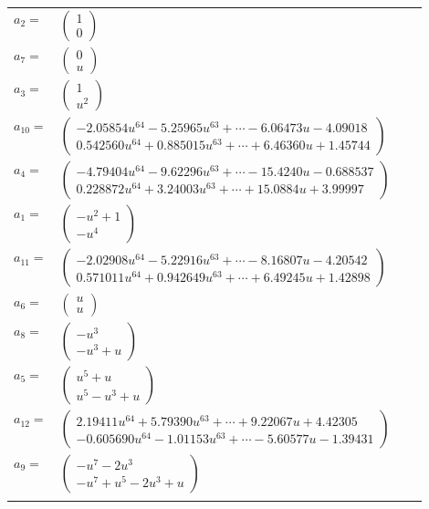 \documentclass[1p]{elsarticle_modified}
\theoremstyle{definition}
\begin{document}
\begin{tabular}{m{7pt} m{180pt} m{7pt} m{180pt} }
\flushright $a_{2}=$&$\begin{pmatrix}1\\0\end{pmatrix}$ \\
\flushright $a_{7}=$&$\begin{pmatrix}0\\u\end{pmatrix}$ \\
\flushright $a_{3}=$&$\begin{pmatrix}1\\u^2\end{pmatrix}$ \\
\flushright $a_{10}=$&$\begin{pmatrix}-2.05854 u^{64}-5.25965 u^{63}+\cdots-6.06473 u-4.09018\\0.542560 u^{64}+0.885015 u^{63}+\cdots+6.46360 u+1.45744\end{pmatrix}$ \\
\flushright $a_{4}=$&$\begin{pmatrix}-4.79404 u^{64}-9.62296 u^{63}+\cdots-15.4240 u-0.688537\\0.228872 u^{64}+3.24003 u^{63}+\cdots+15.0884 u+3.99997\end{pmatrix}$ \\
\flushright $a_{1}=$&$\begin{pmatrix}- u^2+1\\- u^4\end{pmatrix}$ \\
\flushright $a_{11}=$&$\begin{pmatrix}-2.02908 u^{64}-5.22916 u^{63}+\cdots-8.16807 u-4.20542\\0.571011 u^{64}+0.942649 u^{63}+\cdots+6.49245 u+1.42898\end{pmatrix}$ \\
\flushright $a_{6}=$&$\begin{pmatrix}u\\u\end{pmatrix}$ \\
\flushright $a_{8}=$&$\begin{pmatrix}- u^3\\- u^3+u\end{pmatrix}$ \\
\flushright $a_{5}=$&$\begin{pmatrix}u^5+u\\u^5- u^3+u\end{pmatrix}$ \\
\flushright $a_{12}=$&$\begin{pmatrix}2.19411 u^{64}+5.79390 u^{63}+\cdots+9.22067 u+4.42305\\-0.605690 u^{64}-1.01153 u^{63}+\cdots-5.60577 u-1.39431\end{pmatrix}$ \\
\flushright $a_{9}=$&$\begin{pmatrix}- u^7-2 u^3\\- u^7+u^5-2 u^3+u\end{pmatrix}$\\&\end{tabular}
\end{document}
